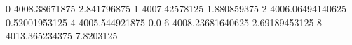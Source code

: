 0 4008.38671875 2.841796875
1 4007.42578125 1.880859375
2 4006.06494140625 0.52001953125
4 4005.544921875 0.0
6 4008.23681640625 2.69189453125
8 4013.365234375 7.8203125
